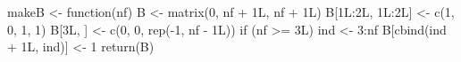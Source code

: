 \begin{Schunk}
\begin{Sinput}
 makeB <- function(nf) {
   B <- matrix(0, nf + 1L, nf + 1L)
   B[1L:2L, 1L:2L] <- c(1, 0, 1, 1)
   B[3L, ] <- c(0, 0, rep(-1, nf - 1L))
   if (nf >= 3L) {
     ind <- 3:nf
     B[cbind(ind + 1L, ind)] <- 1
   }
   return(B)
 }
\end{Sinput}
\end{Schunk}

